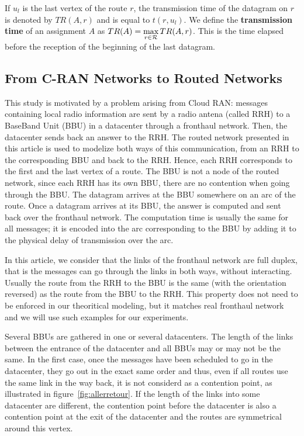 \documentclass[english]{article}
\begin{document}
  If $u_l$ is the last vertex of the route $r$, the transmission time of the datagram on 
  $r$ is denoted by $TR(A,r)$ and is equal to $t(r,u_l)$. We define the \textbf{transmission time} of an assignment $A$ as $TR(A) = \displaystyle \max\limits_{r \in {\cal R}} TR(A,r) $. This is the time elapsed before the reception of the beginning of the last datagram. 
         
  \subsection{From C-RAN Networks to Routed Networks}
  \label{subsection:CRANGRAPH}

  This study is motivated by a problem arising from Cloud RAN: messages containing local radio information are sent by a radio antena (called RRH) to a BaseBand Unit (BBU) in a datacenter through a fronthaul network. Then, the datacenter sends back an answer to the RRH. The routed network presented in this article is used to modelize both ways of this communication, from an RRH to the corresponding BBU and back to the RRH. Hence, each RRH corresponds to the first and the last vertex of a route. The BBU is not a node of the routed network, since each RRH has its own BBU, there are no contention when going through the BBU. The datagram arrives at the BBU somewhere on an arc of the route. Once a datagram arrives at its BBU, the answer is computed and sent back over the fronthaul network. The computation time is usually the same for all messages; it is encoded into the arc corresponding to the BBU by adding it to the physical delay of transmission over the arc.
  
  In this article, we consider that the links of the fronthaul network are full duplex, that is the messages can go through the links in both ways, without interacting. Usually the route from the RRH to the BBU is the same (with the orientation reversed) as the route from the BBU to the RRH. This property does not need to be enforced in our theoritical modeling, but it matches real fronthaul network and we will use such examples for our experiments. 

  
    Several BBUs are gathered in one or several datacenters. The length of the links between the entrance of the datacenter and all BBUs may or may not be the same. In the first case, once the messages have been scheduled to go in the datacenter, they go out in the exact same order and thus, even if all routes use the same link in the way back, it is not considerd as a contention point, as illustrated in figure~\ref{fig:allerretour}. If the length of the links into some datacenter are different, the contention point before the datacenter is also a contention point at the exit of the datacenter and the routes are symmetrical around this vertex.
\end{document}
